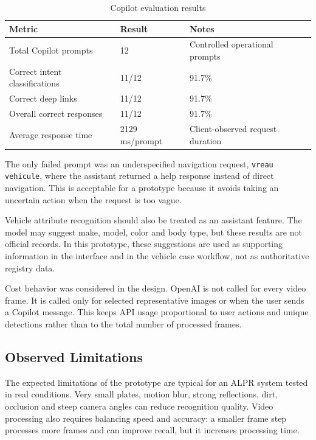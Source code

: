 ﻿\documentclass[12pt,a4paper]{article}
\begin{document}
\begin{table}[H]
\centering
\begin{tabular}{|p{6cm}|p{4cm}|p{4cm}|}
\hline
\textbf{Metric} & \textbf{Result} & \textbf{Notes} \\
\hline
Total Copilot prompts & 12 & Controlled operational prompts \\
\hline
Correct intent classifications & 11/12 & 91.7\% \\
\hline
Correct deep links & 11/12 & 91.7\% \\
\hline
Overall correct responses & 11/12 & 91.7\% \\
\hline
Average response time & 2129 ms/prompt & Client-observed request duration \\
\hline
\end{tabular}
\caption{Copilot evaluation results}
\end{table}

The only failed prompt was an underspecified navigation request, \texttt{vreau vehicule}, where the assistant returned a help response instead of direct navigation. This is acceptable for a prototype because it avoids taking an uncertain action when the request is too vague.

Vehicle attribute recognition should also be treated as an assistant feature. The model may suggest make, model, color and body type, but these results are not official records. In this prototype, these suggestions are used as supporting information in the interface and in the vehicle case workflow, not as authoritative registry data.

Cost behavior was considered in the design. OpenAI is not called for every video frame. It is called only for selected representative images or when the user sends a Copilot message. This keeps API usage proportional to user actions and unique detections rather than to the total number of processed frames.

\subsection{Observed Limitations}

The expected limitations of the prototype are typical for an ALPR system tested in real conditions. Very small plates, motion blur, strong reflections, dirt, occlusion and steep camera angles can reduce recognition quality. Video processing also requires balancing speed and accuracy: a smaller frame step processes more frames and can improve recall, but it increases processing time.
\end{document}
